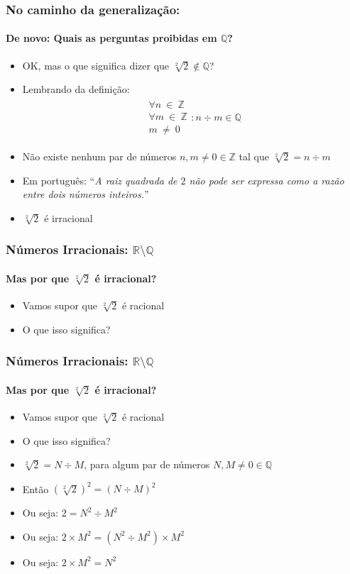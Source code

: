 \documentclass[usenames,dvipsnames,svgnames]{beamer}
\begin{document}
\begin{frame}
	
	\frametitle{No caminho da generalização:}
	\framesubtitle{De novo: Quais as perguntas proibidas em $\mathbb{Q}$?}

	\begin{itemize}
		\item OK, mas o que significa dizer que $\sqrt[2]{2} \not\in \mathbb{Q}$?
		\item Lembrando da definição:
		\begin{equation}
		\begin{aligned}
			\substack{\forall n ~\in~ \mathbb{Z} \\ \forall m ~\in~ \mathbb{Z} \\ m ~\neq~ 0}: n \div m \in \mathbb{Q}
		\end{aligned}
		\end{equation}
		\item Não existe nenhum par de números $n,m \neq 0 \in \mathbb{Z}$ tal que $\sqrt[2]{2} = n \div m$
		\item Em português: ``\emph{A raiz quadrada de $2$ não pode ser expressa como a {\color{red}razão} entre dois números inteiros.}''
		\item $\sqrt[2]{2}$ é {\color{red}irracional}
	\end{itemize}

\end{frame}

\begin{frame}
	
	\frametitle{Números Irracionais: $\mathbb{R} \setminus \mathbb{Q}$}
	\framesubtitle{Mas {\color{red}por que} $\sqrt[2]{2}$ é irracional?}

	\begin{itemize}
		\item Vamos supor que $\sqrt[2]{2}$ é racional
		\item O que isso significa?
	\end{itemize}

\end{frame}

\begin{frame}
	
	\frametitle{Números Irracionais: $\mathbb{R} \setminus \mathbb{Q}$}
	\framesubtitle{Mas {\color{red}por que} $\sqrt[2]{2}$ é irracional?}

	\begin{itemize}
		\item Vamos supor que $\sqrt[2]{2}$ é racional
		\item O que isso significa?
		\item $\sqrt[2]{2} = N \div M$, para algum par de números $N,M \neq 0 \in \mathbb{Q}$
		\item Então ${(\sqrt[2]{2})}^2 = {(N \div M)}^2$
		\item Ou seja: $2 = N^2 \div M^2$
		\item Ou seja: $2 \times M^2 = (N^2 \div M^2) \times M^2$
		\item Ou seja: $2 \times M^2 = N^2$
	\end{itemize}

\end{frame}
\end{document}
